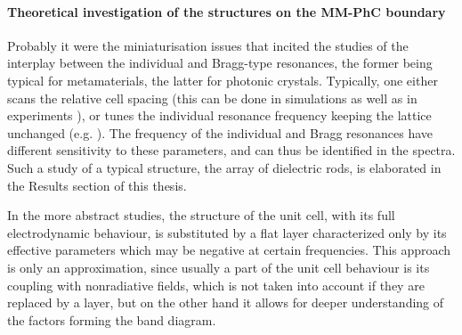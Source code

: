 \paragraph{Theoretical investigation of the structures on the MM-PhC boundary}%
Probably it were the miniaturisation issues that incited the studies of the interplay between the individual and Bragg-type resonances, the former being typical for metamaterials, the latter for photonic crystals. Typically, one either scans the relative cell spacing (this can be done in simulations \cite{shi2007, dominec2014transition} as well as in experiments \cite{rybin2015}),  %
or tunes the individual resonance frequency keeping the lattice unchanged (e.g. \cite{chakrabarti2012magnetic}). The frequency of the individual and Bragg resonances have different sensitivity to these parameters, and can thus be identified in the spectra. Such a study of a typical structure, the array of dielectric rods, is elaborated in the Results section of this thesis.

% 

In the more abstract studies, the structure of the unit cell, with its full electrodynamic behaviour, is substituted by a flat layer characterized only by its effective parameters which may be negative at certain frequencies. %
This approach is only an approximation, since usually a part of the unit cell behaviour is its coupling with nonradiative fields, which is not taken into account if they are replaced by a layer, but on the other hand it allows for deeper understanding of the factors forming the band diagram.

